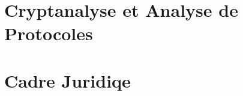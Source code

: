 \documentclass[11pt,a4paper,oneside]{book}
\begin{document}
        \part{Cryptanalyse et Analyse de Protocoles}
        
        
        

        \part{Cadre Juridiqe}
        
        

\end{document}
